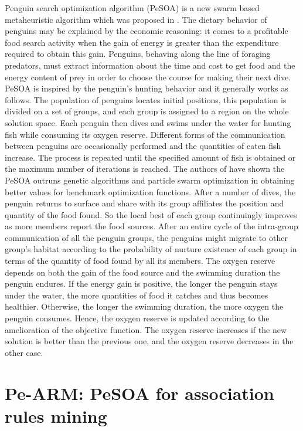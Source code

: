 \documentclass[preprint,12pt]{elsarticle}
\begin{document}
Penguin search optimization algorithm (PeSOA) is a new swarm based metaheuristic algorithm which was proposed in \cite{15}. The dietary behavior of penguins may be explained by the economic reasoning: it comes to a profitable food search activity when the gain of energy is greater than the expenditure required to obtain this gain. Penguins, behaving along the line of foraging predators, must extract information about the time and cost to get food and the energy content of prey in order to choose the course for making their next dive.
 PeSOA is inspired by the penguin’s hunting behavior and it generally works as follows. The population of penguins locates initial positions, this population is divided on a set of groups, and each group is assigned to a region on the whole solution space. Each penguin then dives and swims under the water for hunting fish while consuming its oxygen reserve. Different forms of the communication between penguins are occasionally performed and the quantities of eaten fish increase. The process is repeated until the specified amount of fish is obtained or the maximum number of iterations is reached. The authors of \cite{15} have shown the PeSOA outruns genetic algorithms and particle swarm optimization in obtaining better values for benchmark optimization functions. 
After a number of dives, the penguin returns to surface and share with its group affiliates the position and quantity of the food found. So the local best of each group continuingly
 improves as more members report the food sources. After an entire cycle of the intra-group communication of all the penguin groups, the penguins might migrate to other group’s habitat according to the probability of nurture existence of each group in terms of the quantity of food found by all its members.
The oxygen reserve depends on both the gain of the food source and the swimming duration the penguin endures. If the energy gain is positive, the longer the penguin stays under the water, the more quantities of food it catches and thus becomes healthier. Otherwise, the longer the swimming duration, the more oxygen the penguin consumes. Hence, the oxygen reserve is updated according to the amelioration of the objective function. The oxygen reserve increases if the new solution is better than the previous one, and the oxygen reserve decreases in the other case.
\section{Pe-ARM: PeSOA for association rules mining}
\end{document}
